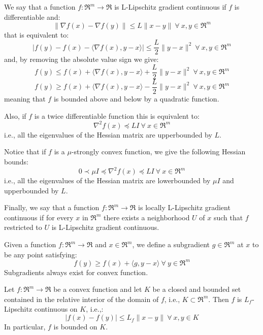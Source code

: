 \begin{definition} \label{def:l_lipschitz_continuity}
We say that a function $f: \Re^m \rightarrow \Re$ is L-Lipschitz gradient continuous if $f$ is differentiable and:
$$
\| \nabla f(x) - \nabla f(y) \| \leq L \| x - y \| \ \forall \ x, y \in \Re^m
$$
that is equivalent to:
$$
| f(y) - f(x) - \langle \nabla f(x), y - x \rangle | \leq \frac{L}{2} \| y - x \|^2 \ \forall \ x, y \in \Re^m
$$
and, by removing the absolute value sign we give:
$$
f(y) \leq f(x) + \langle \nabla f(x), y - x \rangle + \frac{L}{2} \| y - x \|^2 \ \forall \ x, y \in \Re^m
$$
$$
f(y) \geq f(x) + \langle \nabla f(x), y - x \rangle - \frac{L}{2} \| y - x \|^2 \ \forall \ x, y \in \Re^m
$$
meaning that $f$ is bounded above and below by a quadratic function.

Also, if $f$ is a twice differentiable function this is equivalent to:
$$
\nabla^2 f(x) \preceq L I \ \forall \ x \in \Re^m
$$
i.e., all the eigenvalues of the Hessian matrix are upperbounded by $L$.

Notice that if $f$ is a $\mu$-strongly convex function, we give the following Hessian bounds:
$$
0 \prec \mu I \preceq \nabla^2 f(x) \preceq L I \ \forall \ x \in \Re^m
$$
i.e., all the eigenvalues of the Hessian matrix are lowerbounded by $\mu I$ and upperbounded by $L$.

Finally, we say that a function $f: \Re^m \rightarrow \Re$ is locally L-Lipschitz gradient continuous if for every $x$ in $\Re^m$ there exists a neighborhood $U$ of $x$ such that $f$ restricted to $U$ is L-Lipschitz gradient continuous.
\end{definition}

\begin{definition}[Subgradient] \label{def:subgradient}
Given a function $f: \Re^m \rightarrow \Re$ and $x \in \Re^m$, we define a subgradient $g \in \Re^m$ at $x$ to be any point satisfying:
$$
	f(y) \geq f(x) + \langle g, y - x \rangle \ \forall \ y \in \Re^m
$$
Subgradients always exist for convex function.
\end{definition}


\begin{theorem} \label{def:l_f_lipschitz_cvx_continuity}
Let $f: \Re^m \rightarrow \Re$ be a convex function and let $K$ be a closed and bounded set contained in the relative interior of the domain of $f$, i.e., $K \subset \Re^m$. Then $f$ is $L_f$-Lipschitz continuous on $K$, i.e.,:
$$
| f(x) - f(y) | \leq L_f \| x - y \| \ \forall \ x, y \in K
$$
In particular, $f$ is bounded on $K$.
\end{theorem}

